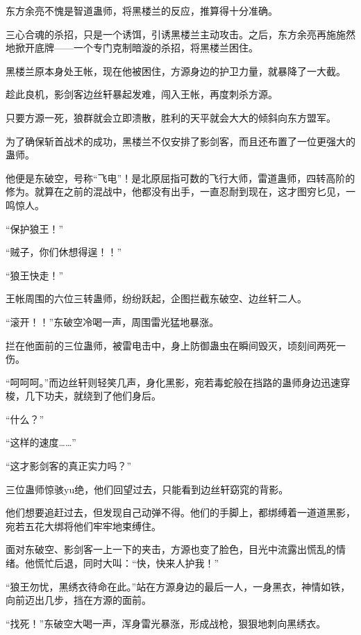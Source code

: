 
\begin{this_body}

东方余亮不愧是智道蛊师，将黑楼兰的反应，推算得十分准确。

三心合魂的杀招，只是一个诱饵，引诱黑楼兰主动攻击。之后，东方余亮再施施然地掀开底牌——一个专门克制暗漩的杀招，将黑楼兰困住。

黑楼兰原本身处王帐，现在他被困住，方源身边的护卫力量，就暴降了一大截。

趁此良机，影剑客边丝轩暴起发难，闯入王帐，再度刺杀方源。

只要方源一死，狼群就会立即溃散，胜利的天平就会大大的倾斜向东方盟军。

为了确保斩首战术的成功，黑楼兰不仅安排了影剑客，而且还布置了一位更强大的蛊师。

他便是东破空，号称“飞电”！是北原屈指可数的飞行大师，雷道蛊师，四转高阶的修为。就算在之前的混战中，他都没有出手，一直忍耐到现在，这才图穷匕见，一鸣惊人。

“保护狼王！”

“贼子，你们休想得逞！！”

“狼王快走！”

王帐周围的六位三转蛊师，纷纷跃起，企图拦截东破空、边丝轩二人。

“滚开！！”东破空冷喝一声，周围雷光猛地暴涨。

拦在他面前的三位蛊师，被雷电击中，身上防御蛊虫在瞬间毁灭，顷刻间两死一伤。

“呵呵呵。”而边丝轩则轻笑几声，身化黑影，宛若毒蛇般在挡路的蛊师身边迅速穿梭，几下功夫，就绕到了他们身后。

“什么？”

“这样的速度……”

“这才影剑客的真正实力吗？”

三位蛊师惊骇yu绝，他们回望过去，只能看到边丝轩窈窕的背影。

他们想要追赶过去，但发现自己动弹不得。他们的手脚上，都绑缚着一道道黑影，宛若五花大绑将他们牢牢地束缚住。

面对东破空、影剑客一上一下的夹击，方源也变了脸色，目光中流露出慌乱的情绪。他慌忙后退，同时大叫：“快，快来人护我！”

“狼王勿忧，黑绣衣待命在此。”站在方源身边的最后一人，一身黑衣，神情如铁，向前迈出几步，挡在方源的面前。

“找死！”东破空大喝一声，浑身雷光暴涨，形成战枪，狠狠地刺向黑绣衣。


\end{this_body}
